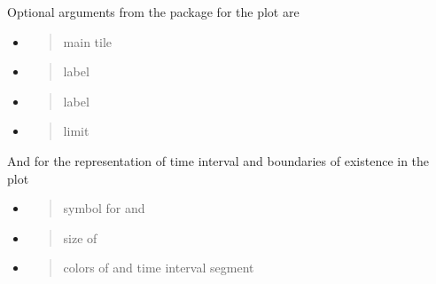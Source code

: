 \documentclass[a4paper,12pt,english]{sphinxhowto}
\begin{document}

Optional arguments from the  package for the plot are
\begin{itemize}
\item {} 
\begin{quote}

main tile
\end{quote}

\item {} 
\begin{quote}

 label
\end{quote}

\item {} 
\begin{quote}

 label
\end{quote}

\item {} 
\begin{quote}

 limit
\end{quote}

\end{itemize}


And for the representation of time interval and boundaries of existence in the plot
\begin{itemize}
\item {} 
\begin{quote}

symbol for  and 
\end{quote}

\item {} 
\begin{quote}

size of 
\end{quote}

\item {} 
\begin{quote}

colors of  and time interval segment
\end{quote}

\end{itemize}
\end{document}
